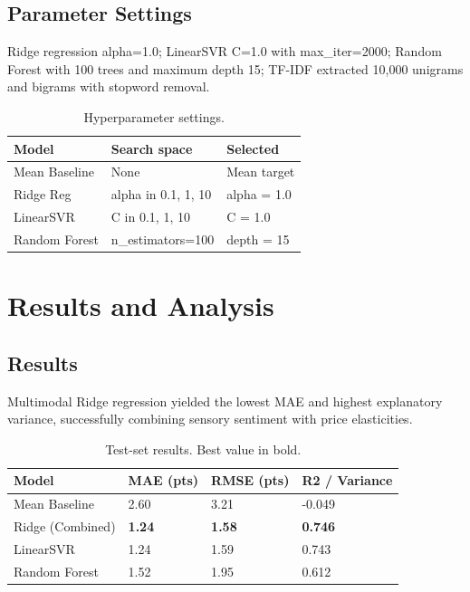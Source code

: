 \documentclass[conference]{IEEEtran}
\begin{document}
\subsection{Parameter Settings}
Ridge regression alpha=1.0; LinearSVR C=1.0 with max_iter=2000; Random Forest with 100 trees and maximum depth 15; TF-IDF extracted 10,000 unigrams and bigrams with stopword removal.

\begin{table}[htbp]
\caption{Hyperparameter settings.}
\label{tab:hyperparameters}
\centering
\begin{tabular}{lll}
\toprule
\textbf{Model} & \textbf{Search space} & \textbf{Selected} \\
\midrule
Mean Baseline & None & Mean target \\
Ridge Reg & alpha in {0.1, 1, 10} & alpha = 1.0 \\
LinearSVR & C in {0.1, 1, 10} & C = 1.0 \\
Random Forest & n\_estimators=100 & depth = 15 \\
\bottomrule
\end{tabular}
\end{table}

\section{Results and Analysis}
\subsection{Results}
Multimodal Ridge regression yielded the lowest MAE and highest explanatory variance, successfully combining sensory sentiment with price elasticities.

\begin{table}[htbp]
\caption{Test-set results. Best value in bold.}
\label{tab:results}
\centering
\begin{tabular}{llll}
\toprule
\textbf{Model} & \textbf{MAE (pts)} & \textbf{RMSE (pts)} & \textbf{R2 / Variance} \\
\midrule
Mean Baseline & 2.60 & 3.21 & -0.049 \\
Ridge (Combined) & \textbf{1.24} & \textbf{1.58} & \textbf{0.746} \\
LinearSVR & 1.24 & 1.59 & 0.743 \\
Random Forest & 1.52 & 1.95 & 0.612 \\
\bottomrule
\end{tabular}
\end{table}
\end{document}
